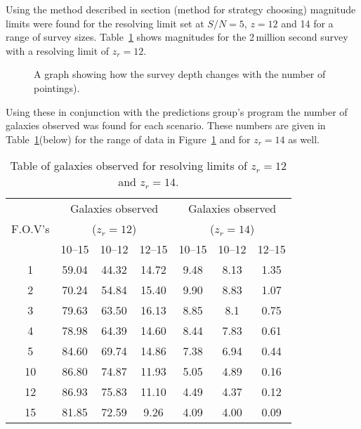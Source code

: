 	Using the method described in section (method for strategy choosing) magnitude limits were found for the resolving limit set at $S/N=5$, $z=12$ and 14 for a range of survey sizes. Table~\ref{tab:galaxies_observed_for_resolving_limits_high_z} shows magnitudes for the 2\,million second survey with a resolving limit of $z_r=12$.
	\begin{figure}[htbp]
		\centering
			\begingroup{}
				\resizebox{0.8\textwidth}{!}{%
					
				}\endgroup
		\caption{A graph showing how the survey depth changes with the number of pointings).\label{fig:survey_depth_changes_with_the_number_of_pointings}}
	\end{figure}
	Using these in conjunction with the predictions group's program the number of galaxies observed was found for each scenario. These numbers are given in Table~\ref{tab:galaxies_observed_for_resolving_limits_high_z}(below) for the range of data in Figure~\ref{fig:survey_depth_changes_with_the_number_of_pointings} and for $z_r=14$ as well.
	\begin{table}[htbp]
		\begin{center}
			\begin{tabular}{c|c|c|c|c|c|c}
				\multirow{3}{*}{F.O.V's} & \multicolumn{3}{c|}{Galaxies observed} & \multicolumn{3}{c}{Galaxies observed} \\
				 & \multicolumn{3}{|c}{($z_r=12$)} & \multicolumn{3}{|c}{($z_r=14$)} \\
				\cline{2-7}
				& 10--15 & 10--12 & 12--15 & 10--15 & 10--12 & 12--15 \\
								\hline\hline
				1 	& 59.04 	& 44.32 	& 14.72	& 9.48 	& 8.13 	& 1.35 \\
				2 	& 70.24 	& 54.84 	& 15.40	& 9.90 	& 8.83 	& 1.07 \\
				3 	& 79.63 	& 63.50 	& 16.13	& 8.85 	& 8.1 	& 0.75 \\
				4 	& 78.98 	& 64.39 	& 14.60	& 8.44 	& 7.83 	& 0.61 \\
				5 	& 84.60 	& 69.74 	& 14.86	& 7.38 	& 6.94 	& 0.44 \\
				10 	& 86.80 	& 74.87 	& 11.93	& 5.05 	& 4.89 	& 0.16 \\
				12 	& 86.93 	& 75.83 	& 11.10	& 4.49 	& 4.37 	& 0.12 \\
				15 	& 81.85 	& 72.59 	& 9.26 	& 4.09 	& 4.00 	& 0.09
			\end{tabular}
		\end{center}
		\caption{Table of galaxies observed for resolving limits of $z_r=12$ and $z_r=14$.\label{tab:galaxies_observed_for_resolving_limits_high_z}}
	\end{table}

